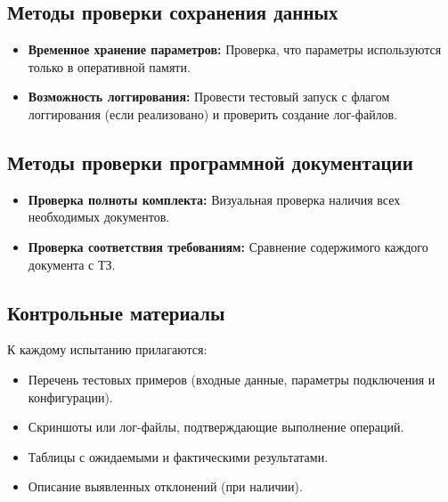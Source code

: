 \subsection{Методы проверки сохранения данных}

\begin{itemize}
    \item \textbf{Временное хранение параметров:} Проверка, что параметры используются только в оперативной памяти.
    \item \textbf{Возможность логгирования:} Провести тестовый запуск с флагом логгирования (если реализовано) и проверить создание лог-файлов.
\end{itemize}

\subsection{Методы проверки программной документации}

\begin{itemize}
    \item \textbf{Проверка полноты комплекта:} Визуальная проверка наличия всех необходимых документов.
    \item \textbf{Проверка соответствия требованиям:} Сравнение содержимого каждого документа с ТЗ.
\end{itemize}

\subsection{Контрольные материалы}

К каждому испытанию прилагаются:

\begin{itemize}
    \item Перечень тестовых примеров (входные данные, параметры подключения и конфигурации).
    \item Скриншоты или лог-файлы, подтверждающие выполнение операций.
    \item Таблицы с ожидаемыми и фактическими результатами.
    \item Описание выявленных отклонений (при наличии).
\end{itemize}






